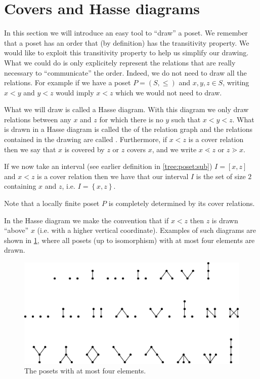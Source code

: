 \section{Covers and Hasse diagrams}
\label{tree:poset:hasse}


In this section we will introduce an easy tool to ``draw'' a poset. We remember that a poset has an order that (by definition) has the transitivity property. We would like to exploit this transitivity property to help us simplify our drawing. What we could do is only explicitely represent the relations that are really necessary to ``communicate'' the order. Indeed, we do not need to draw all the relations. For example if we have a poset $P = (S, \le)$ and $x, y, z \in S$, writing $x < y$ and $y < z$ would imply $x < z$ which we would not need to draw.


What we will draw is called a Hasse diagram. With this diagram we only draw relations between any $x$ and $z$ for which there is no $y$ such that $x < y < z$. 
What is drawn in a Hasse diagram is called the  of the relation graph and the relations contained in the drawing are called . Furthermore, if $x < z$ is a cover relation then we say that $x$ is covered by $z$ or $z$ covers $x$, and we write $x \lessdot z$ or $z \gtrdot x$.


If we now take an interval (see earlier definition in \ref{tree:poset:sub}) $I = [x, z]$ and $x < z$ is a cover relation then we have that our interval $I$ is the set of size $2$ containing $x$ and $z$, i.e. $I = \left\{{x, z}\right\}$.

Note that a locally finite poset $P$ is completely determined by its cover relations.

In the Hasse diagram we make the convention that if $x < z$ then $z$ is drawn ``above'' $x$ (i.e. with a higher vertical coordinate). Examples of such diagrams are shown in \ref{fig:stanley:3-1}, where all posets (up to isomorphism) with at most four elements are drawn.


\begin{figure}
	\centering
	\includegraphics[width=\textwidth]{fig/stanley/3-1}
	\caption{\label{fig:stanley:3-1} The posets with at most four elements. \cite{Stanley:2011:ECV:2124415}}
\end{figure}



